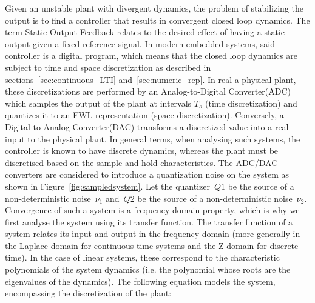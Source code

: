 \documentclass[sigconf]{llncs}
\begin{document}
\begin{figure*}[htb]
{
}
 \caption{Closed loop digital control system\label{fig:sampledsystem}}
\end{figure*}

Given an unstable plant with divergent dynamics, the problem of stabilizing the
output is to find a controller that results in convergent closed loop dynamics.
The term Static Output Feedback relates to the desired effect of having a static
output given a fixed reference signal.  In modern embedded systems, said
controller is a digital program, which means that the closed loop dynamics are
subject to time and space discretization as described in
sections~\ref{sec:continuous_LTI} and~\ref{sec:numeric_rep}.
In real a physical plant, these discretizations are performed by an
Analog-to-Digital Converter(ADC) which samples the output of the plant at
intervals $T_s$ (time discretization) and quantizes it to an FWL representation
(space discretization).  Conversely, a Digital-to-Analog Converter(DAC)
transforms a discretized value into a real input to the physical plant.
In general terms, when analysing such systems, the controller is known to have
discrete dynamics, whereas the plant must be discretised based on the sample
and hold characteristics. The ADC/DAC converters are considered to introduce a
quantization noise on the system as shown in Figure~\ref{fig:sampledsystem}.
Let the quantizer~$Q1$ be the source of a non-deterministic noise~$\nu_{1}$
and~$Q2$ be the source of a non-deterministic noise~$\nu_{2}$.
Convergence of such a system is a frequency domain property, which is why we
first analyse the system using its transfer function.  The transfer function of
a system relates its input and output in the frequency domain (more generally
in the Laplace domain for continuous time systems and the Z-domain for discrete
time).  In the case of linear systems, these correspond to the characteristic
polynomials of the system dynamics (i.e. the polynomial whose roots are the
eigenvalues of the dynamics). The following equation models the system,
encompassing the discretization of the plant:
\end{document}
